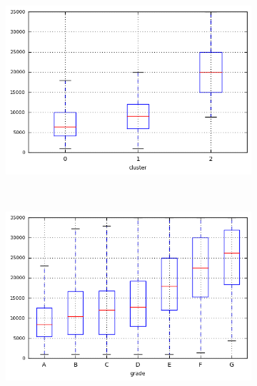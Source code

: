 \begin{anexosenv}
\begin{figure}[ht!]
\begin{subfigure}[t]{0.45\textwidth}
        \end{subfigure}
\end{figure}



\begin{figure}[ht!]
    \centering
                \caption{\emph{Boxplots} de funded\textunderscore amnt}
        \begin{subfigure}[t]{0.45\textwidth}
            \centering

            \centerline{\includegraphics[width=1.05\textwidth]{img/funded_amnt_by_cluster}}
        \end{subfigure}%
        ~ 
        \begin{subfigure}[t]{0.45\textwidth}
            \centering
   
            \centerline{\includegraphics[width=1.05\textwidth]{img/funded_amnt_by_grade}}


\end{subfigure}
\end{figure}
\end{anexosenv}

